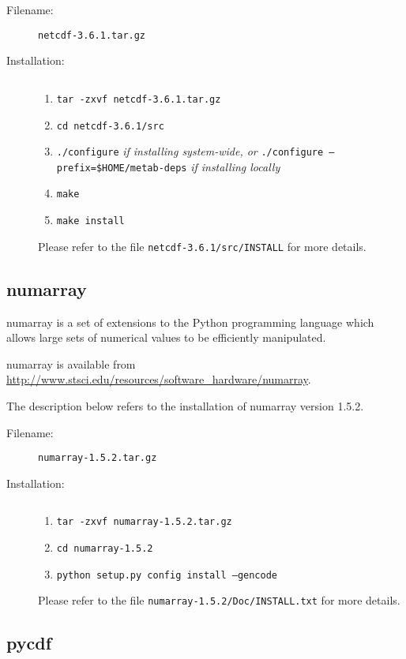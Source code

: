 \begin{description}
\item [Filename:] {\tt netcdf-3.6.1.tar.gz}
\item [Installation:] $ $
  \begin{enumerate}
  \item {\tt tar -zxvf netcdf-3.6.1.tar.gz}
  \item {\tt cd netcdf-3.6.1/src}
  \item {\tt ./configure} {\it if installing system-wide, or}\newline
        {\tt ./configure --prefix=\$HOME/metab-deps} {\it if installing locally}
  \item {\tt make}
  \item {\tt make install}
  \end{enumerate}
Please refer to the file {\tt netcdf-3.6.1/src/INSTALL} for more details.
\end{description}

\subsection{numarray}

numarray is a set of extensions to the Python programming language which
allows large sets of numerical values to be efficiently manipulated.

numarray is available from \url{http://www.stsci.edu/resources/software_hardware/numarray}.

The description below refers to the installation of numarray version
1.5.2.

\begin{description}
\item [Filename:] {\tt numarray-1.5.2.tar.gz}
\item [Installation:] $ $
  \begin{enumerate}
  \item {\tt tar -zxvf numarray-1.5.2.tar.gz}
  \item {\tt cd numarray-1.5.2}
  \item {\tt python setup.py config install --gencode}
  \end{enumerate}
Please refer to the file {\tt numarray-1.5.2/Doc/INSTALL.txt} for more
details.
\end{description}

\subsection{pycdf}

